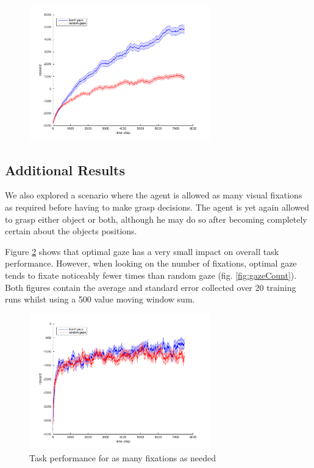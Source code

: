 \documentclass[11]{article}
\begin{document}
\begin{figure}[h]
	\centering
	\includegraphics[width=0.7\textwidth]{results.png}
	\caption{}
	\label{fig:results}
\end{figure}

\subsection{Additional Results}
We also explored a scenario where the agent is allowed as many visual fixations as required before having to make grasp decisions. The agent is yet again allowed to grasp either object or both, although he may do so after becoming completely certain about the objects positions.

Figure \ref{fig:resultsTimless} shows that optimal gaze has a very small impact on overall task performance. However, when looking on the number of fixations, optimal gaze tends to fixate noticeably fewer times than random gaze (fig. \ref{fig:gazeCount}). Both figures contain the average and standard error collected over 20 training runs whilst using a 500 value moving window sum.

\begin{figure}[h]
	\centering
	\includegraphics[width=0.7\textwidth]{resultsTimeless.png}
	\caption{Task performance for as many fixations as needed}
	\label{fig:resultsTimless}
\end{figure}
\end{document}
